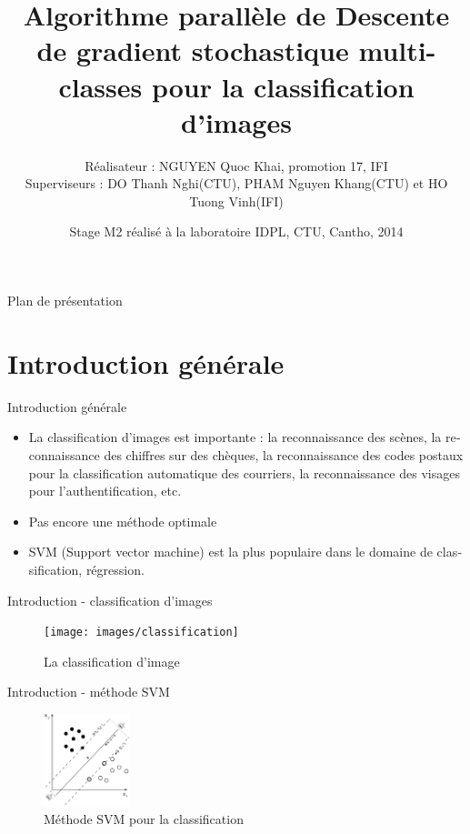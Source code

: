 \documentclass[11pt]{beamer}
\title{Algorithme parallèle de Descente de gradient stochastique multi-classes pour la classification d'images
}
\author[1]{Réalisateur : NGUYEN Quoc Khai, promotion 17, IFI \\[\baselineskip]
Superviseurs : DO Thanh Nghi(CTU), PHAM Nguyen Khang(CTU) et HO Tuong Vinh(IFI)
}
\date{Stage M2 réalisé à la laboratoire IDPL, CTU, Cantho, 2014}
\begin{document}
\begin{otherlanguage}{french}
\begin{frame}
  \titlepage
\end{frame}


\begin{frame}{Plan de présentation}
  \tableofcontents
\end{frame}


\section{Introduction générale}
\begin{frame}{Introduction générale}
\begin{itemize}
\item La classification d'images est importante : la reconnaissance des scènes, la reconnaissance des chiffres sur des chèques, la reconnaissance des codes postaux pour la classification automatique des courriers, la reconnaissance des visages pour l'authentification, etc.

\item Pas encore une méthode optimale

\item SVM (Support vector machine) est la plus populaire dans le domaine de classification, régression.

\end{itemize}
\end{frame}

\begin{frame}{Introduction - classification d'images}
\begin{figure}[ht!]
\centering
\texttt{[image: images/classification]}
\caption{La classification d'image}
\vspace{-2.0em}
\label{fig:classification}
\end{figure}
\end{frame}

\begin{frame}{Introduction - méthode SVM}

\begin{figure}[ht!]
\centering
\includegraphics[width=25mm]{images/svm}
\caption{Méthode SVM pour la classification}
\vspace{-2.0em}
\label{fig:svm}
\end{figure}


\end{frame}
\end{otherlanguage}
\end{document}
